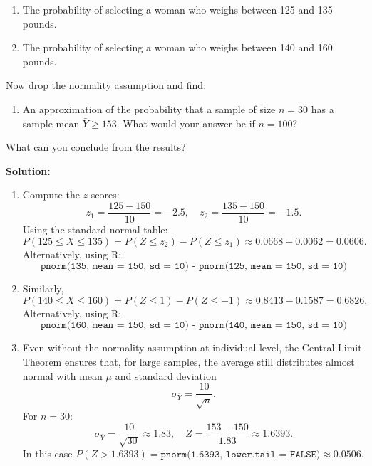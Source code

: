 \documentclass[12pt]{article}
\newif\ifsolutions
\begin{document}
\begin{enumerate}
    \begin{enumerate}
        \item[(a)] The probability of selecting a woman who weighs between 125 and 135 pounds.
        \item[(b)] The probability of selecting a woman who weighs between 140 and 160 pounds.
    \end{enumerate}

    Now drop the normality assumption and find:
    \begin{enumerate}
        \item[(c)] An approximation of the probability that a sample of size \( n = 30 \) has a sample mean \( \bar{Y} \geq 153 \). What would your answer be if \( n = 100 \)?
    \end{enumerate}

    What can you conclude from the results?

    \ifsolutions \color{blue} \textbf{Solution:} \\
    
    \begin{enumerate}[label=(\alph*)]
        \item Compute the $z$-scores:
        $$
        z_1 = \frac{125 - 150}{10} = -2.5, \quad z_2 = \frac{135 - 150}{10} = -1.5.
        $$
        Using the standard normal table:
        $$
        P(125 \leq X \leq 135) = P(Z \leq z_2) - P(Z \leq z_1) \approx 0.0668 - 0.0062 = 0.0606.
        $$
        Alternatively, using R:
        $$
        \texttt{pnorm(135, mean = 150, sd = 10) - pnorm(125, mean = 150, sd = 10)}
        $$
    
        \item Similarly,
        $$
        P(140 \leq X \leq 160) = P(Z \leq 1) - P(Z \leq -1) \approx 0.8413 - 0.1587 = 0.6826.
        $$
        Alternatively, using R:
        $$
        \texttt{pnorm(160, mean = 150, sd = 10) - pnorm(140, mean = 150, sd = 10)}
        $$
    
        \item Even without the normality assumption at individual level, the Central Limit Theorem ensures that, for large samples, the average still distributes almost normal with mean $\mu$ and standard deviation
        \[
        \sigma_{\bar{Y}} = \frac{10}{\sqrt{n}}.
        \]
        For \( n = 30 \):
        \[
        \sigma_{\bar{Y}} = \frac{10}{\sqrt{30}} \approx 1.83, \quad Z = \frac{153 - 150}{1.83} \approx 1.6393.
        \]
        In this case $P(Z > 1.6393) = \texttt{pnorm(1.6393, lower.tail = FALSE)} \approx 0.0506$.
        

\end{enumerate}
\end{enumerate}
\end{document}
